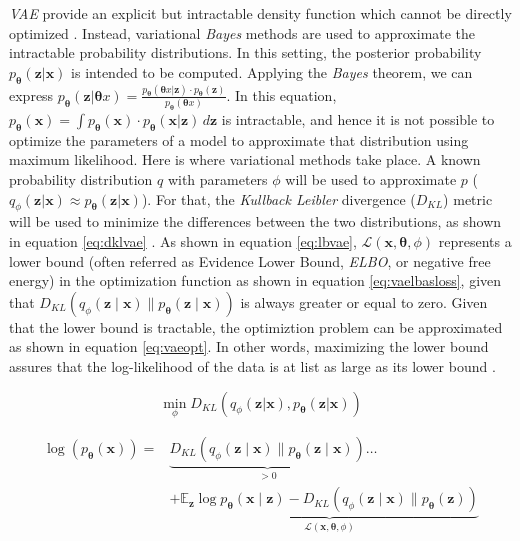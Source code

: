 \textit{VAE} provide an explicit but intractable density function which cannot be directly optimized \cite{Goodfellow2016}. Instead, variational \textit{Bayes} methods are used to approximate the intractable probability distributions. In this setting, the posterior probability $p_\mathbf{\theta}(\mathbf{z}|\mathbf{x})$ is intended to be computed. Applying the \textit{Bayes} theorem, we can express $p_\mathbf{\theta}(\mathbf{z}|\mathbf{\theta}{x}) = \frac{p_\mathbf{\theta}(\mathbf{\theta}{x}|\mathbf{z}) \cdot p_\mathbf{\theta}(\mathbf{z})}{p_\mathbf{\theta}(\mathbf{\theta}{x})}$. In this equation, $p_\mathbf{\theta}(\mathbf{x}) = \int{p_\mathbf{\theta}(\mathbf{x}) \cdot p_\mathbf{\theta}(\mathbf{x}|\mathbf{z})} \,d\mathbf{z}$ is intractable, and hence it is not possible to optimize the parameters of a model to approximate that distribution using maximum likelihood. Here is where variational methods take place. A known probability distribution $q$ with parameters $\phi$ will be used to approximate $p$ ($q_\phi(\mathbf{z}|\mathbf{x}) \approx p_\mathbf{\theta}(\mathbf{z}|\mathbf{x})$). For that, the \textit{Kullback Leibler} divergence ($D_{KL}$) metric will be used to minimize the differences between the two distributions, as shown in equation \ref{eq:dklvae} \cite{kingma2019}. As shown in equation \ref{eq:lbvae}, $\mathcal{L}(\mathbf{x}, \mathbf{\theta}, \phi)$ represents a lower bound (often referred as Evidence Lower Bound, \textit{ELBO}, or negative free energy) in the optimization function as shown in equation \ref{eq:vaelbasloss}, given that $D_{K L}\left(q_{\phi}(\mathbf{z} \mid \mathbf{x}) \| p_{\mathbf{\theta}}(\mathbf{z} \mid \mathbf{x})\right)$ is always greater or equal to zero. Given that the lower bound is tractable, the optimiztion problem can be approximated as shown in equation \ref{eq:vaeopt}. In other words, maximizing the lower bound assures that the log-likelihood of the data is at list as large as its lower bound \cite{wei2021}.

\begin{equation}
\label{eq:dklvae}
\min_{\phi} D_{KL}\left(q_\phi(\mathbf{z}|\mathbf{x}), p_\mathbf{\theta}(\mathbf{z}|\mathbf{x})\right)
\end{equation}

\begin{equation}
\label{eq:lbvae}
\begin{aligned}
\log \left(p_{\mathbf{\theta}}(\mathbf{x})\right) =& \underbrace{D_{K L}\left(q_{\phi}(\mathbf{z} \mid \mathbf{x}) \| p_{\mathbf{\theta}}(\mathbf{z} \mid \mathbf{x})\right)}_{>0} \ldots \\
&+\underbrace{\mathbb{E}_{\mathbf{z}} \log p_{\mathbf{\theta}}(\mathbf{x} \mid \mathbf{z})-D_{K L}\left(q_{\phi}(\mathbf{z} \mid \mathbf{x}) \| p_{\mathbf{\theta}}(\mathbf{z})\right)}_{\mathcal{L}(\mathbf{x}, \mathbf{\theta}, \phi)}
\end{aligned}
\end{equation}

